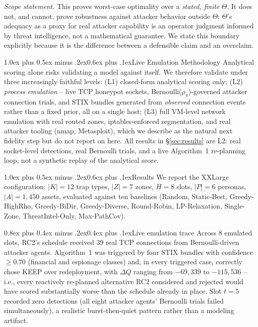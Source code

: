 \documentclass[10pt,twocolumn]{article}
\makeatletter
\renewcommand{\section}{\@startsection{section}{1}{0pt}%
  {1.0ex plus 0.5ex minus .2ex}{0.6ex plus .1ex}{\normalfont\large\bfseries}}
\renewcommand{\subsection}{\@startsection{subsection}{2}{0pt}%
  {0.8ex plus 0.4ex minus .2ex}{0.4ex plus .1ex}{\normalfont\bfseries}}
\makeatother
\begin{document}
\emph{Scope statement.} This proves worst-case optimality over a \emph{stated, finite} $\Theta$. It does not, and cannot, prove robustness against attacker behavior outside $\Theta$; $\Theta$'s adequacy as a proxy for real attacker capability is an operator judgment informed by threat intelligence, not a mathematical guarantee. We state this boundary explicitly because it is the difference between a defensible claim and an overclaim.

\section{Live Emulation Methodology}\label{sec:emulation}
Analytical scoring alone risks validating a model against itself. We therefore validate under three increasingly faithful levels: (L1) closed-form analytical scoring only; (L2) \emph{process emulation} -- live TCP honeypot sockets, Bernoulli($\rho_\pi$)-governed attacker connection trials, and STIX bundles generated from \emph{observed} connection events rather than a fixed prior, all on a single host; (L3) full VM-level network emulation with real routed zones, iptables-enforced segmentation, and real attacker tooling (nmap, Metasploit), which we describe as the natural next fidelity step but do not report on here. All results in \S\ref{sec:results} are L2: real socket-level detections, real Bernoulli trials, and a live Algorithm~1 re-planning loop, not a synthetic replay of the analytical score.

\section{Results}\label{sec:results}
We report the XXLarge configuration: $|K|{=}12$ trap types, $|Z|{=}7$ zones, $H{=}8$ slots, $|P|{=}6$ personas, $|A|{=}1{,}450$ assets, evaluated against ten baselines (Random, Static-Best, Greedy-HighRho, Greedy-BiDir, Greedy-Diverse, Round-Robin, LP-Relaxation, Single-Zone, ThreatIntel-Only, Max-PathCov).

\subsection{Live emulation trace}
Across 8 emulated slots, RC2's schedule received 39 real TCP connections from Bernoulli-driven attacker agents. Algorithm~1 was triggered by four STIX bundles with confidence $\geq 0.70$ (financial and espionage classes) and, in every triggered case, correctly chose \textsc{KEEP} over redeployment, with $\Delta Q$ ranging from $-69{,}339$ to $-115{,}536$ -- i.e., every reactively re-planned alternative RC2 considered and rejected would have scored substantially worse than the schedule already in place. Slot $t{=}5$ recorded zero detections (all eight attacker agents' Bernoulli trials failed simultaneously), a realistic burst-then-quiet pattern rather than a modeling artifact.
\end{document}
